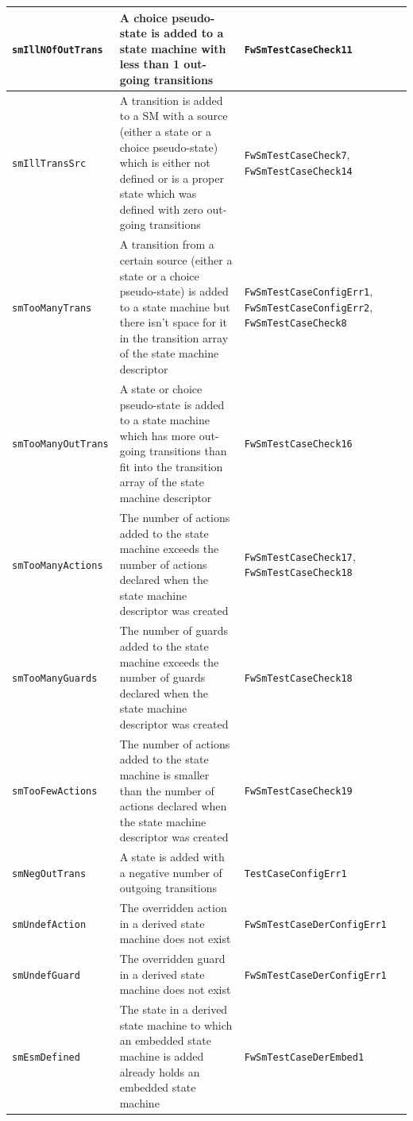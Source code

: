 \documentclass[requirements]{../fwprofile}
\begin{document}
\begin{longtable}{|p{3cm}|p{3.7cm}|p{4.5cm}|}
\hline
\texttt{smIllNOfOutTrans} & A choice pseudo-state is added to a state machine with less than 1 out-going transitions & \texttt{FwSmTestCaseCheck11} \\
\hline
\texttt{smIllTransSrc} & A transition is added to a SM with a source (either a state or a choice pseudo-state) which is either not defined or is 
a proper state which was defined with zero out-going transitions & \texttt{FwSmTestCaseCheck7}, \texttt{FwSmTestCaseCheck14} \\
\hline
\texttt{smTooManyTrans} & A transition from a certain source (either a state or a choice pseudo-state) is added to a state machine but there isn't 
space for it in the transition array of the state machine descriptor & \texttt{FwSmTestCaseConfigErr1}, \texttt{FwSmTestCaseConfigErr2}, 
\texttt{FwSmTestCaseCheck8} \\
\hline
\texttt{smTooManyOutTrans} & A state or choice pseudo-state is added to a state machine which has more out-going transitions than fit into 
the transition array of the state machine descriptor & \texttt{FwSmTestCaseCheck16} \\
\hline
\texttt{smTooManyActions} & The number of actions added to the state machine exceeds the number of actions declared when the state machine 
descriptor was created & \texttt{FwSmTestCaseCheck17}, \texttt{FwSmTestCaseCheck18} \\
\hline
\texttt{smTooManyGuards} & The number of guards added to the state machine exceeds the number of guards declared when the state machine 
descriptor was created & \texttt{FwSmTestCaseCheck18} \\
\hline
\texttt{smTooFewActions} & The number of actions added to the state machine is smaller than the number of actions declared when the state machine 
descriptor was created & \texttt{FwSmTestCaseCheck19} \\
\hline
\texttt{smNegOutTrans} & A state is added with a negative number of outgoing transitions & \texttt{TestCaseConfigErr1} \\
\hline
\texttt{smUndefAction} & The overridden action in a derived state machine does not exist & \texttt{FwSmTestCaseDerConfigErr1} \\
\hline
\texttt{smUndefGuard} & The overridden guard in a derived state machine does not exist & \texttt{FwSmTestCaseDerConfigErr1} \\
\hline
\texttt{smEsmDefined} & The state in a derived state machine to which an embedded state machine is added already holds an embedded state machine 
& \texttt{FwSmTestCaseDerEmbed1} \\

\end{longtable}
\end{document}
